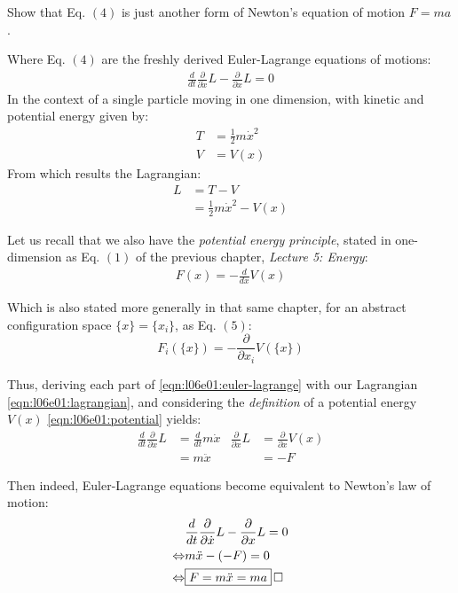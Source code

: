 \documentclass[solutions.tex]{subfiles}
\begin{document}
\maketitle
\begin{exercise}
Show that Eq. $(4)$ is just another form of Newton's
equation of motion $F = ma$.
\end{exercise}
Where Eq. $(4)$ are the freshly derived Euler-Lagrange
equations of motions:
\begin{align}
	\frac{d}{dt}\frac{\partial}{\partial\dot{x}}L - \frac{\partial}{\partial x}L = 0
	\label{eqn:l06e01:euler-lagrange}
\end{align}
In the context of a single particle moving in one dimension, with
kinetic and potential energy given by:
\begin{align*}
	T &= \frac{1}{2} m\dot{x}^2 \\
	V &= V(x)
\end{align*}
From which results the Lagrangian:
\begin{align}
	L &= T-V \nonumber\\
	~ &= \frac{1}{2}m\dot{x}^2-V(x)
	\label{eqn:l06e01:lagrangian}
\end{align}

Let us recall that we also have the \textit{potential energy
principle}, stated in one-dimension as Eq. $(1)$ of the previous
chapter, \textit{Lecture 5: Energy}:
\begin{align}
	F(x) = -\frac{d}{dx}V(x)
	\label{eqn:l06e01:potential}
\end{align}

Which is also stated more generally in that same chapter, for an
abstract configuration space $\{x\} = \{x_i\}$, as Eq. $(5)$:
\[
	F_i(\{x\}) = -\frac{\partial}{\partial x_i}V(\{x\})
\]

Thus, deriving each part of \eqref{eqn:l06e01:euler-lagrange} with
our Lagrangian \eqref{eqn:l06e01:lagrangian}, and considering the
\textit{definition} of a potential energy $V(x)$ \eqref{eqn:l06e01:potential}
yields:
\begin{align*}
	\frac{d}{dt}\frac{\partial}{\partial\dot{x}}L &=
		\frac{d}{dt}m\dot{x} &
	\frac{\partial}{\partial x}L &=
		\frac{\partial}{\partial x}V(x) \\
	~ &= m\ddot{x} & ~ &= -F
\end{align*}

Then indeed, Euler-Lagrange equations become equivalent to Newton's law of motion:
\begin{align*}
	~ & \frac{d}{dt}\frac{\partial}{\partial\dot{x}}L - \frac{\partial}{\partial x}L = 0 \\
	\Leftrightarrow & m\ddot{x}-(-F) = 0 \\
	\Leftrightarrow & \boxed{F = m\ddot{x} = ma} \qed
\end{align*}
\end{document}
